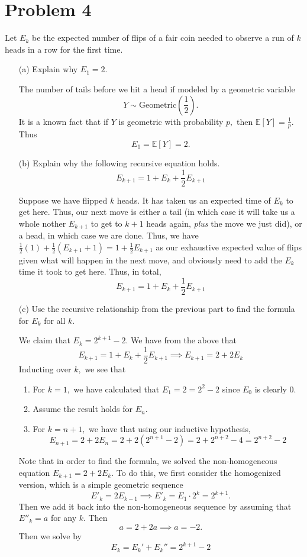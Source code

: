 \documentclass[11pt]{article}
\newcommand{\bbE}{\mathbb{E}}
\begin{document}
\newpage
\section*{Problem 4}

Let \( E_k \) be the expected number of flips of a fair coin needed to observe a run of \( k \) heads in a row for the first time.

\begin{enumerate}
    \item[(a)] Explain why \( E_1 = 2 \).
    \begin{solution}
The number of tails before we hit a head if modeled by a geometric variable 
\[Y \sim \text{Geometric}(\frac{1}{2}).\] It is a known fact that if $Y$ is geometric with probability $p,$ then $\bbE[Y] = \frac{1}{p}.$ Thus
        \[E_1 = \bbE[Y] = 2.\]
    \end{solution}
    \item[(b)] Explain why the following recursive equation holds.
    \[
    E_{k+1} = 1 + E_k + \frac{1}{2} E_{k+1}
    \]
\begin{solution}
Suppose we have flipped $k$ heads. It has taken us an expected time of $E_k$ to get here. Thus, our next move is either a tail (in which case it will take us a whole nother $E_{k+1}$ to get to $k+1$ heads again, \textit{plus} the move we just did), or a head, in which case we are done. Thus, we have $\frac{1}{2}(1) + \frac{1}{2}(E_{k+1} + 1) = 1 + \frac{1}{2}E_{k+1}$ as our exhaustive expected value of flips given what will happen in the next move, and obviously need to add the $E_k$ time it took to get here. Thus, in total, 
\[E_{k+1} = 1 + E_k + \frac{1}{2}E_{k+1}\]
\end{solution}
    \item[(c)] Use the recursive relationship from the previous part to find the formula for \( E_k \) for all \( k \).
\begin{solution}
We claim that $E_{k} = 2^{k+1} -2.$
    We have from the above that 
    \[E_{k+1} = 1 + E_k + \frac{1}{2}E_{k+1} \implies E_{k+1} = 2 + 2E_k\] Inducting over $k,$ we see that 
    \begin{enumerate}
        \item For $k = 1,$ we have calculated that $E_1 = 2 = 2^2 -2$ since $E_0$ is clearly $0.$ 
        \item Assume the result holds for $E_n.$ 
        \item For $k = n+1,$ we have that using our inductive hypothesis, 
        \[E_{n+1} = 2 + 2E_{n} = 2 + 2(2^{n+1} -2) = 2 + 2^{n+2} - 4 = 2^{n+2} -2\]
    \end{enumerate}
Note that in order to find the formula, we solved the non-homogeneous equation $E_{k+1} = 2 + 2E_k.$ To do this, we first consider the homogenized version, which is a simple geometric sequence
\[E'_{k} = 2E_{k-1} \implies E'_{k} = E_1\cdot2^{k} = 2^{k+1}.\] Then we add it back into the non-homogeneous sequence by assuming that $E''_{k} = a$ for any $k.$ Then 
\[a = 2 + 2a \implies a = -2.\] Then we solve by 
\[E_k = E_k' + E_k'' = 2^{k+1} - 2\]
\end{solution}
\end{enumerate}
\end{document}
